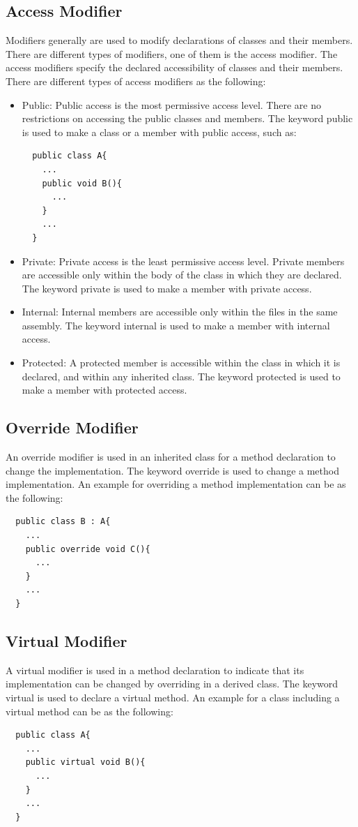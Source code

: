 \documentclass[11pt,twoside,a4paper]{fdyartcl}
\begin{document}
\subsection{Access Modifier}
Modifiers generally are used to modify declarations of classes and their members. There are different types of modifiers, one of them is the access modifier. The access modifiers specify the declared accessibility of classes and their members. There are different types of access modifiers as the following:
\begin{itemize}
\item Public: Public access is the most permissive access level. There are no restrictions on accessing the public classes and members. The keyword {\scriptsize public} is used to make a class or a member with public access, such as:
{\scriptsize \begin{verbatim}
  public class A{
    ...
    public void B(){
      ...
    }
    ...
  }
\end{verbatim}}
\item Private: Private access is the least permissive access level. Private members are accessible only within the body of the class in which they are declared. The keyword {\scriptsize private} is used to make a member with private access.
\item Internal: Internal members are accessible only within the files in the same assembly. The keyword {\scriptsize internal} is used to make a member with internal access.
\item Protected: A protected member is accessible within the class in which it is declared, and within any inherited class. The keyword {\scriptsize protected} is used to make a member with protected access.
\end{itemize}
\subsection{Override Modifier}
An override modifier is used in an inherited class for a method declaration to change the implementation. The keyword {\scriptsize override} is used to change a method implementation. An example for overriding a method implementation can be as the following:
{\scriptsize \begin{verbatim}
  public class B : A{
    ...
    public override void C(){
      ...
    }
    ...
  }
\end{verbatim}}
\subsection{Virtual Modifier}
A virtual modifier is used in a method declaration to indicate that its implementation can be changed by overriding in a derived class. The keyword {\scriptsize virtual} is used to declare a virtual method. An example for a class including a virtual method can be as the following:
{\scriptsize \begin{verbatim}
  public class A{
    ...
    public virtual void B(){
      ...
    }
    ...
  }
\end{verbatim}}
\end{document}
